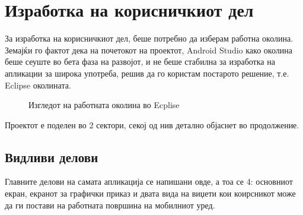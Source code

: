 \documentclass{uvamscse}
\begin{document}
\section{Изработка на корисничкиот дел}

За изработка на корисничкиот дел, беше потребно да изберам работна околина. Земајќи го фактот дека на почетокот на проектот, Android Studio како околина беше сеуште во бета фаза на развојот, и не беше стабилна за изработка на апликации за широка употреба, решив да го користам постарото решение, т.е. Eclipse околината.
\vspace{5mm}


\begin{figure}[H]
\centering
  \caption{Изгледот на работната околина во Ecplise}
  \label{fig:ecplise}
\end{figure}

\vspace{5mm}

Проектот е поделен во 2 сектори, секој од нив детално објаснет во продолжение.

\newpage
\subsection{Видливи делови}

Главните делови на самата апликација се напишани овде, а тоа се 4: основниот екран, екранот за графички приказ и двата вида на виџети кои коирсникот може да ги постави на работната површина на мобилниот уред.
\end{document}
